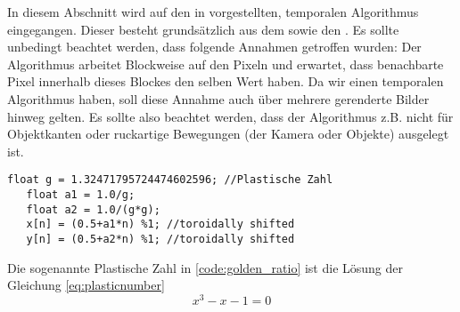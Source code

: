 In diesem Abschnitt wird auf den in \cite{hal02158423} vorgestellten, temporalen Algorithmus eingegangen.
Dieser besteht grundsätzlich aus dem  sowie den 
. Es sollte unbedingt beachtet werden, dass folgende
Annahmen getroffen wurden: Der Algorithmus arbeitet Blockweise auf den Pixeln und erwartet, dass benachbarte
Pixel innerhalb dieses Blockes den selben Wert haben. Da wir einen temporalen Algorithmus haben, soll diese Annahme 
auch über mehrere gerenderte Bilder hinweg gelten. Es sollte also beachtet werden, dass der Algorithmus z.B. nicht 
für Objektkanten oder ruckartige Bewegungen (der Kamera oder Objekte) ausgelegt ist.
\cite{heitz:hal-02150657}

\cite{quasirandomsequencesbyRoberts}
\label{code:golden_ratio}
\begin{lstlisting}[style=CStyle]
   float g = 1.32471795724474602596; //Plastische Zahl
   float a1 = 1.0/g;
   float a2 = 1.0/(g*g);
   x[n] = (0.5+a1*n) %1; //toroidally shifted
   y[n] = (0.5+a2*n) %1; //toroidally shifted
\end{lstlisting}
Die sogenannte Plastische Zahl in \ref{code:golden_ratio} ist die Lösung der
Gleichung \ref{eq:plasticnumber}
\begin{equation}\label{eq:plasticnumber}
   x^{3} - x - 1 = 0
\end{equation}
